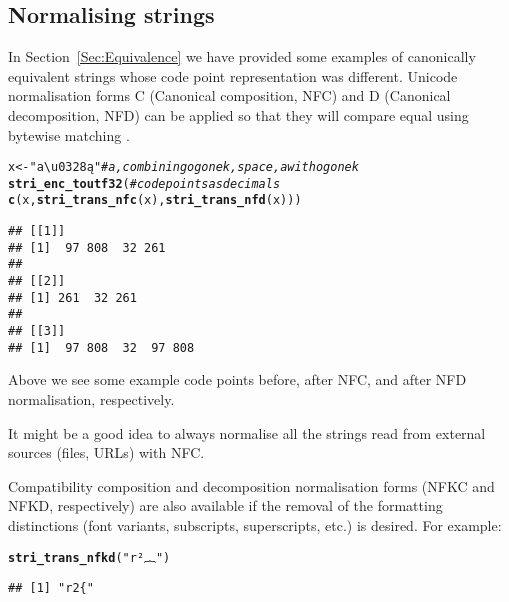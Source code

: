 \documentclass[nojss]{jss}\usepackage[]{graphicx}\usepackage[]{xcolor}
\makeatletter
\newcommand{\hlstr}[1]{\textcolor[rgb]{0.192,0.494,0.8}{#1}}%
\newcommand{\hlcom}[1]{\textcolor[rgb]{0.678,0.584,0.686}{\textit{#1}}}%
\newcommand{\hlstd}[1]{\textcolor[rgb]{0.345,0.345,0.345}{#1}}%
\newcommand{\hlkwb}[1]{\textcolor[rgb]{0.69,0.353,0.396}{#1}}%
\newcommand{\hlkwd}[1]{\textcolor[rgb]{0.737,0.353,0.396}{\textbf{#1}}}%
\newenvironment{kframe}{%
 \def\at@end@of@kframe{}%
 \ifinner\ifhmode%
  \def\at@end@of@kframe{\end{minipage}}%
  \begin{minipage}{\columnwidth}%
 \fi\fi%
 \def\FrameCommand##1{\hskip\@totalleftmargin \hskip-\fboxsep
 \colorbox{shadecolor}{##1}\hskip-\fboxsep
     \hskip-\linewidth \hskip-\@totalleftmargin \hskip\columnwidth}%
 \MakeFramed {\advance\hsize-\width
   \@totalleftmargin\z@ \linewidth\hsize
   \@setminipage}}%
 {\par\unskip\endMakeFramed%
 \at@end@of@kframe}
\newenvironment{knitrout}{}{} %
\makeatother
\begin{document}
\subsection{Normalising strings}\label{Sec:normalisation}

In Section~\ref{Sec:Equivalence} we have provided some examples
of canonically equivalent strings whose code point representation was different.
Unicode normalisation forms C (Canonical composition, NFC) and D
(Canonical decomposition, NFD) can be applied so that they
will compare equal using bytewise matching \citep{usa15:normalization}.

\begin{knitrout}
\color{fgcolor}\begin{kframe}
\begin{alltt}
\hlstd{x} \hlkwb{<-} \hlstr{"a\textbackslash{}u0328 ą"}   \hlcom{# a, combining ogonek, space, a with ogonek}
\hlkwd{stri_enc_toutf32}\hlstd{(}  \hlcom{# code points as decimals}
  \hlkwd{c}\hlstd{(x,} \hlkwd{stri_trans_nfc}\hlstd{(x),} \hlkwd{stri_trans_nfd}\hlstd{(x)))}
\end{alltt}
\begin{verbatim}
## [[1]]
## [1]  97 808  32 261
## 
## [[2]]
## [1] 261  32 261
## 
## [[3]]
## [1]  97 808  32  97 808
\end{verbatim}
\end{kframe}
\end{knitrout}

Above we see some example code points before, after NFC,
and after NFD normalisation, respectively.

It might be a good idea to always normalise all the strings
read from external sources (files, URLs) with NFC.

Compatibility composition and decomposition normalisation forms (NFKC and
NFKD, respectively) are also available if
the removal of the formatting distinctions (font variants,
subscripts, superscripts, etc.) is desired. For example:


\begin{knitrout}
\color{fgcolor}\begin{kframe}
\begin{alltt}
\hlkwd{stri_trans_nfkd}\hlstd{(}\hlstr{"r²︷"}\hlstd{)}
\end{alltt}
\begin{verbatim}
## [1] "r2{"
\end{verbatim}
\end{kframe}
\end{knitrout}
\end{document}
